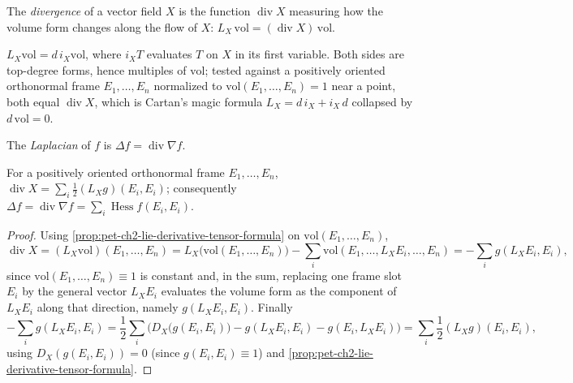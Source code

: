 \begin{definition}
  \label{def:pet-ch2-divergence-lie-derivative}
  \leanok
  The \emph{divergence} of a vector field $X$ is the function $\operatorname{div}X$
  measuring how the volume form changes along the flow of $X$:
  $L_X\,\mathrm{vol}=(\operatorname{div}X)\,\mathrm{vol}$.
\end{definition}

\begin{remark}
  \label{rem:pet-ch2-lie-derivative-volume-exact}
  \leanok
  $L_X\mathrm{vol}=d\,i_X\mathrm{vol}$, where $i_XT$ evaluates $T$ on $X$ in
  its first variable.  Both sides are top-degree forms, hence multiples of
  $\mathrm{vol}$; tested against a positively oriented orthonormal frame
  $E_1,\dots,E_n$ normalized to $\mathrm{vol}(E_1,\dots,E_n)=1$ near a point,
  both equal $\operatorname{div}X$, which is Cartan's magic formula
  $L_X=d\,i_X+i_X\,d$ collapsed by $d\,\mathrm{vol}=0$.
\end{remark}

\begin{definition}[Laplacian]
  \label{def:pet-ch2-laplacian}
  \leanok
  The \emph{Laplacian} of $f$ is $\Delta f=\operatorname{div}\nabla f$.
\end{definition}

\begin{proposition}
  \label{prop:pet-ch2-divergence-trace-formula}
  \leanok
  For a positively oriented orthonormal frame $E_1,\dots,E_n$,
  $\operatorname{div}X=\sum_i\frac12(L_Xg)(E_i,E_i)$; consequently
  $\Delta f=\operatorname{div}\nabla f=\sum_i\operatorname{Hess}f(E_i,E_i)$.
\end{proposition}
\begin{proof}
  \leanok
  Using \cref{prop:pet-ch2-lie-derivative-tensor-formula} on
  $\mathrm{vol}(E_1,\dots,E_n)$,
  \[
    \operatorname{div}X = (L_X\mathrm{vol})(E_1,\dots,E_n)
    = L_X\big(\mathrm{vol}(E_1,\dots,E_n)\big)-\sum_i\mathrm{vol}(E_1,\dots,L_XE_i,\dots,E_n)
    = -\sum_ig(L_XE_i,E_i),
  \]
  since $\mathrm{vol}(E_1,\dots,E_n)\equiv1$ is constant and, in the sum,
  replacing one frame slot $E_i$ by the general vector $L_XE_i$ evaluates the
  volume form as the component of $L_XE_i$ along that direction, namely
  $g(L_XE_i,E_i)$. Finally
  \[
    -\sum_ig(L_XE_i,E_i)
    = \frac12\sum_i\Big(D_X\big(g(E_i,E_i)\big)-g(L_XE_i,E_i)-g(E_i,L_XE_i)\Big)
    = \sum_i\frac12(L_Xg)(E_i,E_i),
  \]
  using $D_X(g(E_i,E_i))=0$ (since $g(E_i,E_i)\equiv1$) and
  \cref{prop:pet-ch2-lie-derivative-tensor-formula}.
\end{proof}


